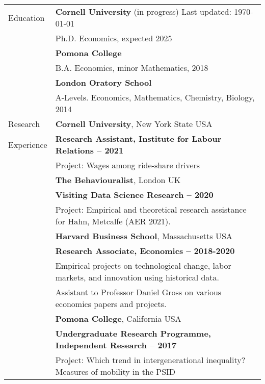 \documentclass[letterpaper,11pt,oneside]{article}
\begin{document}
\noindent \begin{longtable}{@{} l l}
\Large{Education}
    & \textbf{Cornell University} (in progress)  \hfill Last updated: \today \\
    &  Ph.D. Economics, expected 2025 \vspace{0.1cm} \\
    & \textbf{Pomona College} \\
    &  B.A. Economics, minor Mathematics, 2018 \\
    &  \textbf{London Oratory School}\\
    &  A-Levels. Economics, Mathematics, Chemistry, Biology, 2014 \vspace{0.2cm} \\

\Large{Research}
    & \textbf{Cornell University}, New York State USA \\
\Large{Experience}
    & \textbf{Research Assistant, Institute for Labour Relations -- 2021} \\
    & Project: Wages among ride-share drivers \vspace{0.2cm} \\
    
    & \textbf{The Behaviouralist}, London UK \\
    & \textbf{Visiting Data Science Research -- 2020} \\
    & Project: Empirical and theoretical research assistance for Hahn, Metcalfe (AER 2021). \vspace{0.2cm} \\

    & \textbf{Harvard Business School}, Massachusetts USA \\
    & \textbf{Research Associate, Economics -- 2018-2020} \\
    & Empirical projects on technological change, labor markets, and innovation using historical data.\\
    & Assistant to Professor Daniel Gross on various economics papers and projects. \vspace{0.2cm} \\
    
    & \textbf{Pomona College}, California USA \\
    & \textbf{Undergraduate Research Programme, Independent Research -- 2017} \\
    & Project: Which trend in intergenerational inequality?  Measures of mobility in the PSID \vspace{0.2cm} \\


\end{longtable}
\end{document}
